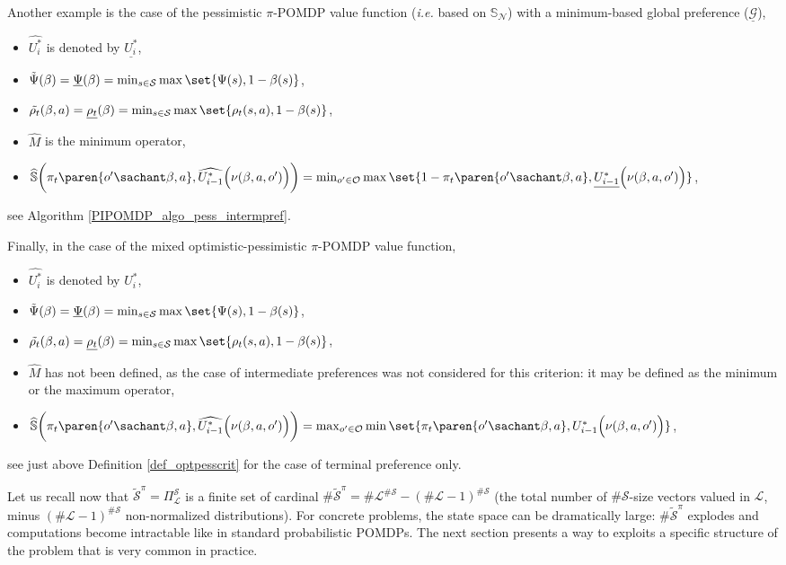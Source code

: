 Another example is the case of the pessimistic $\pi$-POMDP value function 
(\textit{i.e.} based on $\mathbb{S}_{\mathcal{N}}$) 
with a minimum-based global preference ($\underline{\mathcal{G}}$),
\begin{itemize}
\item $\widehat{U^*_{i}}$ is denoted by $\underline{U^*_i}$,
\item $\tilde{\Psi}(\beta) = \underline{\Psi}(\beta) = \min_{s \in \mathcal{S}} \max \set{ \Psi(s), 1 - \beta(s)  }$,
\item $\tilde{\rho_t}(\beta,a) = \underline{\rho_t}(\beta) = \min_{s \in \mathcal{S}} \max \set{ \rho_t(s,a), 1 - \beta(s)  }$,
\item $\widehat{M}$ is the minimum operator,
\item $\widehat{\mathbb{S}}\bigg( \pi_t \paren{o' \sachant \beta, a}, \widehat{U^*_{i-1}} \Big( \nu( \beta,a,o') \Big) \bigg)   = \min_{o' \in \mathcal{O}} \max \set{ 1 - \pi_t \paren{ o' \sachant \beta,a }, \underline{U^*_{i-1}}\Big( \nu( \beta,a,o') \Big)  }$,
\end{itemize}
see Algorithm \ref{PIPOMDP_algo_pess_intermpref}.

Finally, in the case of the mixed optimistic-pessimistic $\pi$-POMDP value function,
\begin{itemize}
\item $\widehat{U^*_{i}}$ is denoted by $U^*_i$,
\item $\tilde{\Psi}(\beta) = \underline{\Psi}(\beta) = \min_{s \in \mathcal{S}} \max \set{ \Psi(s), 1 - \beta(s)  }$,
\item $\tilde{\rho_t}(\beta,a) = \underline{\rho_t}(\beta) = \min_{s \in \mathcal{S}} \max \set{ \rho_t(s,a), 1 - \beta(s)  }$,
\item $\widehat{M}$ has not been defined, as the case of intermediate preferences was not considered for this criterion: 
it may be defined as the minimum or the maximum operator,
\item $\widehat{\mathbb{S}}\bigg( \pi_t \paren{o' \sachant \beta, a}, \widehat{U^*_{i-1}} \Big( \nu( \beta,a,o') \Big) \bigg)  = \max_{o' \in \mathcal{O}} \min \set{\pi_t \paren{ o' \sachant \beta,a }, U^*_{i-1}\Big( \nu( \beta,a,o') \Big)  }$,
\end{itemize}
see just above Definition \ref{def_optpesscrit} for the case of terminal preference only.

Let us recall now that $\tilde{\mathcal{S}}^{\pi} = \Pi^{\mathcal{S}}_{\mathcal{L}}$ 
is a finite set of cardinal $\# \tilde{\mathcal{S}}^{\pi} = \# \mathcal{L}^{\# \mathcal{S}} - (\# \mathcal{L}-1)^{\# \mathcal{S}}$ 
(the total number of $\# \mathcal{S}$-size vectors valued in $\mathcal{L}$, minus $(\# \mathcal{L}-1)^{\# \mathcal{S}}$ non-normalized distributions).
For concrete problems, the state space can be dramatically large: $\# \tilde{\mathcal{S}}^{\pi}$ explodes and computations become intractable like in standard probabilistic POMDPs. The next section presents a way to exploits a specific structure of the problem that is very common in practice.
 
